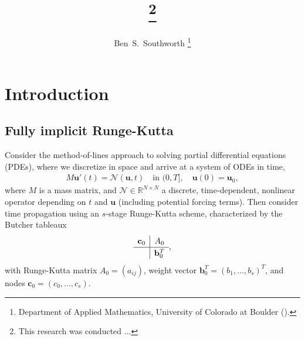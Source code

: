\documentclass[review]{siamart}
\title{{\TheTitle}\thanks{This research was conducted ...
  }}
\author{%
  Ben~S.~Southworth
  \thanks{Department of Applied Mathematics,
          University of Colorado at Boulder
          (\email{ben.s.southworth@gmail.com}).}
}
\begin{document}
\maketitle
\allowdisplaybreaks

\begin{abstract}

\end{abstract}


\section{Introduction}

\subsection{Fully implicit Runge-Kutta}

Consider the method-of-lines approach to solving partial differential equations (PDEs),
where we discretize in space and arrive at a system of ODEs in time,
%
\begin{align}\label{eq:problem}
	M\mathbf{u}'(t) =  \mathcal{N}(\mathbf{u},t) \quad\text{in }(0,T], \quad \mathbf{u}(0) = \mathbf{u}_0,
\end{align}
%
where $M$ is a mass matrix, and $\mathcal{N}\in\mathbb{R}^{N\times N}$ a discrete, time-dependent, nonlinear
operator depending on $t$ and $\mathbf{u}$ (including potential forcing terms).
Then consider time propagation using an $s$-stage
Runge-Kutta scheme, characterized by the Butcher tableaux 
%
\begin{align*}
	\renewcommand\arraystretch{1.2}
	\begin{array}
	{c|c}
	\mathbf{c}_0 & A_0\\
	\hline
	& \mathbf{b}_0^T
	\end{array},
\end{align*}
%
with Runge-Kutta matrix $A_0 = (a_{ij})$, weight vector $\mathbf{b}_0^T = (b_1, \ldots, b_s)^T$, and 
nodes $\mathbf{c}_0 = (c_0, \ldots, c_s)$.
\end{document}
